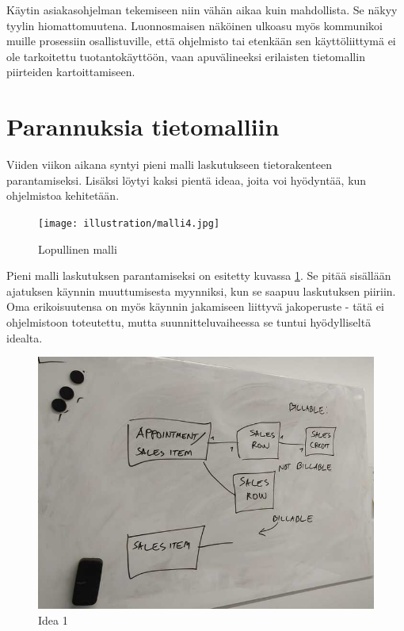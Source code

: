 Käytin asiakasohjelman tekemiseen niin vähän aikaa kuin mahdollista. Se
näkyy tyylin hiomattomuutena. Luonnosmaisen näköinen ulkoasu myös
kommunikoi muille prosessiin osallistuville, että ohjelmisto tai
etenkään sen käyttöliittymä ei ole tarkoitettu tuotantokäyttöön, vaan
apuvälineeksi erilaisten tietomallin piirteiden kartoittamiseen.

\hypertarget{parannuksia-tietomalliin}{%
\section{Parannuksia tietomalliin}\label{parannuksia-tietomalliin}}

Viiden viikon aikana syntyi pieni malli laskutukseen tietorakenteen
parantamiseksi. Lisäksi löytyi kaksi pientä ideaa, joita voi hyödyntää,
kun ohjelmistoa kehitetään.

\begin{figure}
\centering
\texttt{[image: illustration/malli4.jpg]}
\caption{\label{finalmodel1-again}Lopullinen malli}
\end{figure}

Pieni malli laskutuksen parantamiseksi on esitetty kuvassa
\ref{finalmodel1-again}. Se pitää sisällään ajatuksen käynnin
muuttumisesta myynniksi, kun se saapuu laskutuksen piiriin. Oma
erikoisuutensa on myös käynnin jakamiseen liittyvä jakoperuste - tätä ei
ohjelmistoon toteutettu, mutta suunnitteluvaiheessa se tuntui
hyödylliseltä idealta.

\begin{figure}
\centering
\includegraphics{illustration/final-idea-1.jpg}
\caption{\label{finalidea1}Idea 1}
\end{figure}

